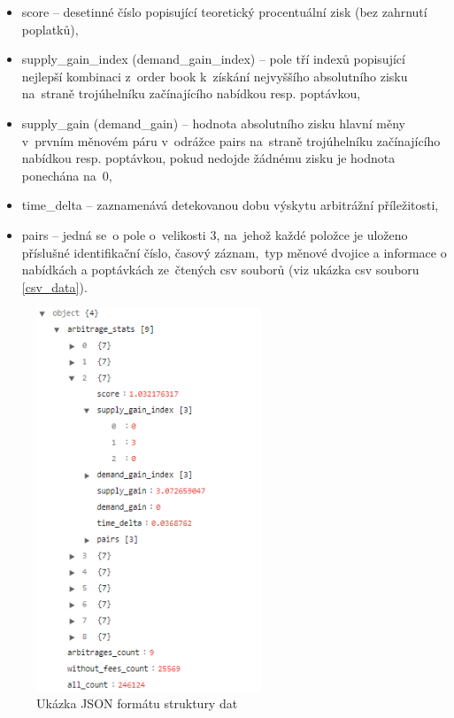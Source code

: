 \documentclass[thesis=B,czech]{FITthesis}[2019/03/21]
\begin{document}
\begin{itemize}
    \item score -- desetinné číslo popisující teoretický procentuální zisk (bez zahrnutí poplatků),
    \item supply\_gain\_index (demand\_gain\_index) -- pole tří indexů popisující nejlepší kombinaci z~order book k~získání nejvyššího absolutního zisku na~straně trojúhelníku začínajícího nabídkou resp. poptávkou,
    \item supply\_gain (demand\_gain) -- hodnota absolutního zisku hlavní měny v~prvním měnovém páru v~odrážce pairs na~straně trojúhelníku začínajícího nabídkou resp. poptávkou, pokud nedojde žádnému zisku je hodnota ponechána na~0,
    \item time\_delta -- zaznamenává detekovanou dobu výskytu arbitrážní \linebreak příležitosti, 
    \item pairs -- jedná se~o pole o~velikosti 3, na~jehož každé položce je uloženo příslušné identifikační číslo, časový záznam,~typ měnové dvojice a informace o nabídkách a poptávkách ze~čtených csv souborů (viz ukázka csv souboru \ref{csv_data}).
\end{itemize}
\begin{figure}\centering
	\includegraphics[width=0.6\textwidth]{images/json_data.PNG}
	\caption{Ukázka JSON formátu struktury dat}\label{json_data}
\end{figure}
\end{document}
